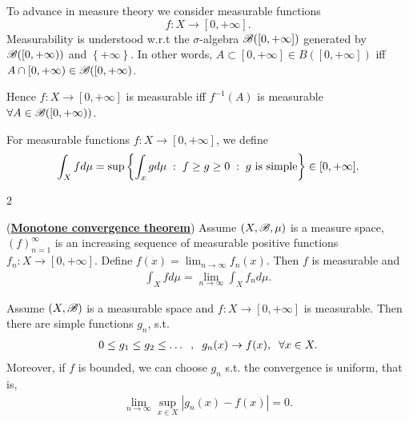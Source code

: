 To advance in measure theory we consider measurable functions $$f:X\rightarrow [0,+\infty].$$ Measurability is understood w.r.t the $\sigma$-algebra
 $\mathscr{B}([0,+\infty])$ generated by $\mathscr{B}(\left[0,+\infty\right))$ and $\left\{+\infty\right\}$. In other words, $A\subset[0,+\infty]\in B([0,+\infty])$ iff $A\cap [0,+\infty)\in \mathscr{B}([0,+\infty)$.
\begin{remark}
    Hence $f:X\rightarrow [0,+\infty]$ is measurable iff $f^{-1}(A)$ is measurable $\forall A\in \mathscr{B}([0,+\infty))$.
\end{remark}

\begin{definition}
    For measurable functions $f:X\rightarrow [0,+\infty]$, we define \begin{align}
        \int_X fd\mu = \sup\left\{\int_xgd\mu \hspace{1mm}:\hspace{1mm} f\geq g\geq 0\hspace{1mm}:\hspace{1mm} g \text{ is simple}\right\}\in[0,+\infty].
    \end{align}
\end{definition}
2
\begin{theorem}{(\underline{\textbf{Monotone convergence theorem}})}
    Assume $(X,\mathscr{B},\mu)$ is a measure space, $(f)_{n=1}^\infty$ is an increasing sequence of measurable positive functions $f_n:X\rightarrow [0,+\infty]$. Define $f(x)=\lim_{n\rightarrow \infty}f_n(x)$. 
    Then $f$ is measurable and  \begin{align}
        \int_X fd\mu = \lim_{n\rightarrow \infty} \int_X f_nd\mu.
    \end{align}
    
\end{theorem}

\begin{theorem}
    Assume $(X,\mathscr{B})$ is a measurable space and $f:X\rightarrow [0,+\infty]$ is measurable. Then there are simple functions $g_n$, s.t. \begin{align*}
        0\leq g_1\leq g_2\leq\ldots \hspace{2mm},\hspace{2mm} g_n(x)\rightarrow f(x),\hspace{2mm}\forall x\in X.
    \end{align*}
    Moreover, if $f$ is bounded, we can choose $g_n$ s.t. the convergence is uniform, that is, \begin{align}
        \lim_{n\rightarrow\infty}\sup_{x\in X}|g_n(x)-f(x)|=0.
    \end{align}
\end{theorem}